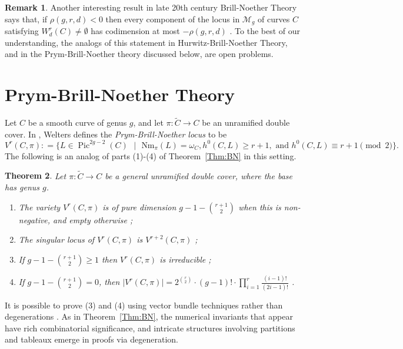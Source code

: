 \documentclass{amsart}
\newtheorem{theorem}{Theorem}[section]
\theoremstyle{definition}
\newtheorem{remark}[theorem]{Remark}
\newcommand{\Pic}{\operatorname{Pic}}
\begin{document}
\begin{remark}
Another interesting result in late 20th century Brill-Noether Theory says that, if $\rho(g,r,d) < 0$ then every component of the locus in $\mathcal{M}_g$ of curves $C$ satisfying $W^r_d (C) \neq \emptyset$ has codimension at most $-\rho(g,r,d)$ \cite{Steffen98}. To the best of our understanding, the analogs of this statement in Hurwitz-Brill-Noether Theory, and in the Prym-Brill-Noether theory discussed below, are open problems.  
\end{remark}


\section{Prym-Brill-Noether Theory}
\label{Sec:Prym}

Let $C$ be a smooth curve of genus $g$, and let $\pi \colon \widetilde{C} \to C$ be an unramified double cover.  In \cite{Welters85}, Welters defines the \emph{Prym-Brill-Noether locus} to be
\[
V^r (C,\pi) \colon = \Big\{  L \in \Pic^{2g-2} (C) \mbox{ } \vert \mbox{ } \textrm{Nm}_{\pi} (L) = \omega_C , h^0 (C,L) \geq r+1, \text{ and } h^0 (C,L) \equiv r+1 \pmod{2} \Big\} .
\]
The following is an analog of parts (1)-(4) of Theorem~\ref{Thm:BN} in this setting.

\begin{theorem}
\label{Thm:PBN}
Let $\pi \colon \widetilde{C} \to C$ be a general unramified double cover, where the base has genus $g$.
\begin{enumerate}
\item  The variety $V^r (C,\pi)$ is of pure dimension $g-1 - {{r+1}\choose{2}}$ when this is non-negative, and empty otherwise \cite{Welters85, Bertram87}{\em ;}
\item  The singular locus of $V^r (C,\pi)$ is $V^{r+2} (C,\pi)$ \cite{Welters85} {\em ;}
\item  If $g-1 - {{r+1}\choose{2}} \geq 1$ then $V^r (C,\pi)$ is irreducible \cite{Debarre00} {\em ;}
\item  If $g-1 - {{r+1}\choose{2}} = 0$, then $\vert V^r (C,\pi) \vert = 2^{{r}\choose{2}} \cdot (g-1)! \cdot \prod_{i=1}^r \frac{(i-1)!}{(2i-1)!}$ \cite{dCP95}.
\end{enumerate}
\end{theorem}

\noindent It is possible to prove (3) and (4) using vector bundle techniques rather than degenerations \cite{dCP95}. As in Theorem~\ref{Thm:BN}, the numerical invariants that appear have rich combinatorial significance, and intricate structures involving partitions and tableaux emerge in proofs via degeneration.  
\end{document}
